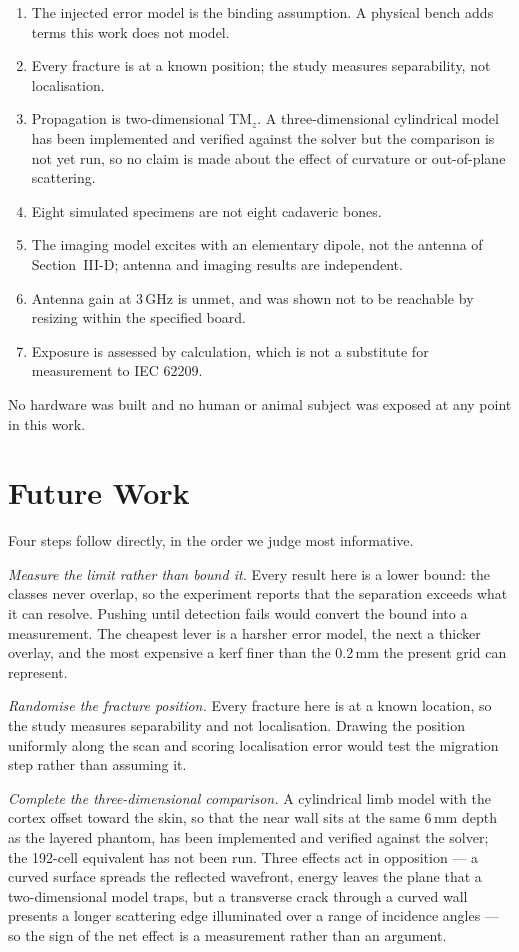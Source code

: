 \documentclass[conference]{IEEEtran}
\begin{document}
\begin{enumerate}
\item The injected error model is the binding assumption. A physical bench
adds terms this work does not model.
\item Every fracture is at a known position; the study measures
separability, not localisation.
\item Propagation is two-dimensional TM$_z$. A three-dimensional
cylindrical model has been implemented and verified against the solver but
the comparison is not yet run, so no claim is made about the effect of
curvature or out-of-plane scattering.
\item Eight simulated specimens are not eight cadaveric bones.
\item The imaging model excites with an elementary dipole, not the antenna
of Section~III-D; antenna and imaging results are independent.
\item Antenna gain at 3\,GHz is unmet, and was shown not to be reachable by
resizing within the specified board.
\item Exposure is assessed by calculation, which is not a substitute for
measurement to IEC 62209.
\end{enumerate}

No hardware was built and no human or animal subject was exposed at any
point in this work.

\section{Future Work}

Four steps follow directly, in the order we judge most informative.

\emph{Measure the limit rather than bound it.} Every result here is a lower
bound: the classes never overlap, so the experiment reports that the
separation exceeds what it can resolve. Pushing until detection fails would
convert the bound into a measurement. The cheapest lever is a harsher error
model, the next a thicker overlay, and the most expensive a kerf finer than
the 0.2\,mm the present grid can represent.

\emph{Randomise the fracture position.} Every fracture here is at a known
location, so the study measures separability and not localisation. Drawing
the position uniformly along the scan and scoring localisation error would
test the migration step rather than assuming it.

\emph{Complete the three-dimensional comparison.} A cylindrical limb model
with the cortex offset toward the skin, so that the near wall sits at the
same 6\,mm depth as the layered phantom, has been implemented and verified
against the solver; the 192-cell equivalent has not been run. Three effects
act in opposition --- a curved surface spreads the reflected wavefront,
energy leaves the plane that a two-dimensional model traps, but a transverse
crack through a curved wall presents a longer scattering edge illuminated
over a range of incidence angles --- so the sign of the net effect is a
measurement rather than an argument.
\end{document}
